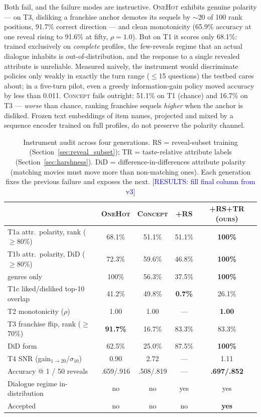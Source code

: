\documentclass[11pt]{article}
\newcommand{\results}[1]{\textcolor{blue}{[RESULTS: #1]}}
\begin{document}
Both fail, and the failure modes are instructive.
\textsc{OneHot} exhibits genuine polarity --- on T3, disliking a franchise
anchor demotes its sequels by $\sim$20 of 100 rank positions, 91.7\% correct
direction --- and clean monotonicity (65.9\% accuracy at one reveal rising
to 91.6\% at fifty, $\rho = 1.0$). But on T1 it scores only 68.1\%: trained
exclusively on \emph{complete} profiles, the few-reveals regime that an
actual dialogue inhabits is out-of-distribution, and the response to a
single revealed attribute is unreliable. Measured naively, the instrument
would discriminate policies only weakly in exactly the turn range
($\leq$15 questions) the testbed cares about; in a five-turn pilot, even a
greedy information-gain policy moved accuracy by less than 0.011.
\textsc{Concept} fails outright: 51.1\% on T1 (chance) and 16.7\% on T3 ---
\emph{worse} than chance, ranking franchise sequels \emph{higher} when the
anchor is disliked. Frozen text embeddings of item names, projected and
mixed by a sequence encoder trained on full profiles, do not preserve the
polarity channel.

\begin{table}[t]
\centering
\caption{Instrument audit across four generations. \textsc{RS} =
reveal-subset training (Section~\ref{sec:reveal_subset}); \textsc{TR} =
taste-relative attribute labels (Section~\ref{sec:harshness}). DiD =
difference-in-differences attribute polarity (matching movies must move
more than non-matching ones). Each generation fixes the previous failure
and exposes the next. \results{fill final column from v3}}
\label{tab:audit}
\small
\begin{tabular}{lcccc}
\toprule
 & \textsc{OneHot} & \textsc{Concept} & \textsc{+RS} & \textsc{+RS+TR (ours)} \\
\midrule
T1a attr.\ polarity, rank ($\geq$80\%) & 68.1\% & 51.1\% & 51.1\% & \textbf{100\%} \\
T1b attr.\ polarity, DiD ($\geq$80\%) & 72.3\% & 59.6\% & 46.8\% & \textbf{100\%} \\
\quad genres only & 100\% & 56.3\% & 37.5\% & \textbf{100\%} \\
T1c liked/disliked top-10 overlap & 41.2\% & 49.8\% & \textbf{0.7\%} & 26.1\% \\
T2 monotonicity ($\rho$) & 1.00 & 1.00 & --- & \textbf{1.00} \\
T3 franchise flip, rank ($\geq$70\%) & \textbf{91.7\%} & 16.7\% & 83.3\% & 83.3\% \\
\quad DiD form & 62.5\% & 25.0\% & 87.5\% & \textbf{100\%} \\
T4 SNR (gain$_{1\to20}$/$\sigma_{10}$) & 0.90 & 2.72 & --- & 1.11 \\
Accuracy @ 1 / 50 reveals & .659/.916 & .508/.819 & --- & \textbf{.697/.852} \\
Dialogue regime in-distribution & no & no & yes & yes \\
\midrule
Accepted & no & no & no & \textbf{yes} \\
\bottomrule
\end{tabular}
\end{table}
\end{document}
